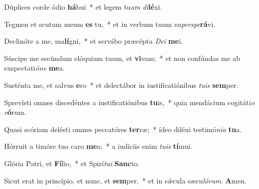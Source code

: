 \item Dúplices corde ódio \textbf{há}bui~* et legem tu\textit{am} \textit{di}\textbf{lé}xi.

\item Tegmen et scutum meum \textbf{es} tu,~* et in verbum tuum su\textit{perspe}\textbf{rá}vi.

\item Declináte a me, ma\textbf{lí}gni,~* et servábo præcépta \textit{Dei} \textbf{me}i.

\item Súscipe me secúndum elóquium tuum, et \textbf{vi}vam;~* et non confúndas me ab exspectati\textit{óne} \textbf{me}a.

\item Susténta me, et salvus \textbf{e}ro~* et delectábor in iustificatiónibus \textit{tuis} \textbf{sem}per.

\item Sprevísti omnes discedéntes a iustificatiónibus \textbf{tu}is,~* quia mendácium cogitáti\textit{o} \textit{e}\textbf{ó}rum.

\item Quasi scóriam delésti omnes peccatóres \textbf{ter}ræ;~* ídeo diléxi testimó\textit{nia} \textbf{tu}a.

\item Hórruit a timóre tuo caro \textbf{me}a;~* a iudíciis enim \textit{tuis} \textbf{tí}mui.

\item Glória Patri, et \textbf{Fí}lio,~* et Spirí\textit{tui} \textbf{Sanc}to.

\item Sicut erat in princípio, et nunc, et \textbf{sem}per,~* et in sǽcula sæcu\textit{lórum}. \textbf{A}men.